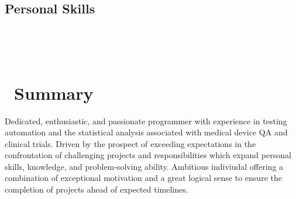 \documentclass[]{./moak-resume}
\begin{document}
\begin{aside}
  \section{Personal Skills}
    ~
\end{aside}
~
\section{ \newline Summary}
\begin{entrylist}
	\entry
	{}
	{}
	{}
	{Dedicated, enthusiastic, and passionate programmer with experience in testing automation and the statistical analysis associated with medical device QA and clinical trials.  Driven by the prospect of exceeding expectations in the confrontation of challenging projects and responsibilities which expand personal skills, knowledge, and problem-solving ability.  Ambitious indiviudal offering a combination of exceptional motivation and a great logical sense to ensure the completion of projects ahead of expected timelines.\\}
\end{entrylist}
\\
\end{document}
